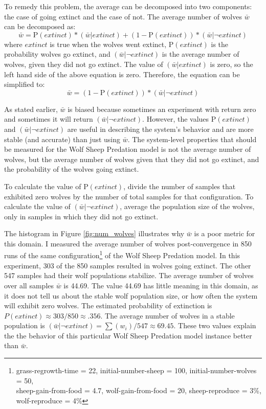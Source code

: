 To remedy this problem, the average can be decomposed into two components: the case of going extinct and the case of not.
The average number of wolves $\bar w$ can be decomposed as:
\[\bar w = \mathrm{P}(extinct) * (\bar w | extinct) + (1 - \mathrm{P}(extinct)) * (\bar w | \neg extinct) \]
where $extinct$ is true when the wolves went extinct, $\mathrm{P}(extinct)$ is the probability wolves go extinct, and $(\bar w | \neg extinct)$ is the average number of wolves, given they did not go extinct.
The value of $(\bar w | extinct)$ is zero, so the left hand side of the above equation is zero.
Therefore, the equation can be simplified to:
\[\bar w = (1 - \mathrm{P}(extinct)) * (\bar w | \neg extinct) \]

As stated earlier, $\bar w$ is biased because sometimes an experiment with return zero and sometimes it will return $(\bar w | \neg extinct)$.
However, the values $\mathrm{P}(extinct)$ and $(\bar  w | \neg extinct)$ are useful in describing the system's behavior and are more stable (and accurate) than just using $\bar w$.
The system-level properties that should be measured for the Wolf Sheep Predation model is not the average number of wolves, but the average number of wolves given that they did not go extinct, and the probability of the wolves going extinct.

To calculate the value of $\mathrm{P}(extinct)$, divide the number of samples that exhibited zero wolves by the number of total samples for that configuration.
To calculate the value of $(\bar w | \neg extinct)$, average the population size of the wolves, only in samples in which they did not go extinct.

The histogram in Figure \ref{fig:num_wolves} illustrates why $\bar w$ is a poor metric for this domain.
I measured the average number of wolves post-convergence in 850 runs of the same configuration\footnote{grass-regrowth-time = 22, initial-number-sheep = 100, initial-number-wolves = 50, \\
sheep-gain-from-food = 4.7, wolf-gain-from-food = 20, sheep-reproduce = 3\%, wolf-reproduce = 4\% } of the Wolf Sheep Predation model.
In this experiment, 303 of the 850 samples resulted in wolves going extinct.
The other 547 samples had their wolf populations stabilize.
The average number of wolves over all samples $\bar w$ is 44.69.
The value 44.69 has little meaning in this domain, as it does not tell us about the stable wolf population size, or how often the system will exhibit zero wolves.
The estimated probability of extinction is $P(extinct) \approx 303 / 850 \approx .356$.
The average number of wolves in a stable population is $(\bar w | \neg extinct) = \sum (w_i) / 547 \approx 69.45$.
These two values explain the the behavior of this particular Wolf Sheep Predation model instance better than $\bar w$.

